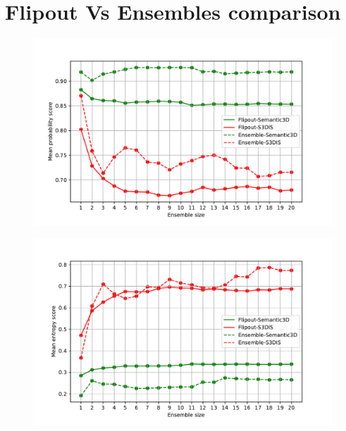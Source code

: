     \section{Flipout Vs Ensembles comparison}
    \begin{figure}[h!]
        \centering
        \includegraphics[scale=0.65]{images/EnsembleVsFlipout_Probs.pdf}
    \end{figure}
    \begin{figure}[h!]
        \centering
        \includegraphics[scale=0.65]{images/EnsembleVsFlipout_Entropy.pdf}
    \end{figure}
    
